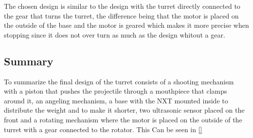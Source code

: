 The chosen design is similar to the design with the turret directly connected to
the gear that turns the turret, the difference being that the motor is placed on
the outside of the base and the motor is geared which makes it more precise when
stopping since it does not over turn as much as the design whitout a gear. 

\subsection{Summary}
To summarize the final design of the turret consists of a shooting mechanism
with a piston that pushes the projectile through a mouthpiece that clamps around
it, an angeling mechanism, a base with the NXT mounted inside to distribute the
weight and to make it shorter, two ultrasonic sensor placed on the front and a
rotating mechanism where the motor is placed on the outside of the turret with a
gear connected to the rotator. This Can be seen in \autoref{}

